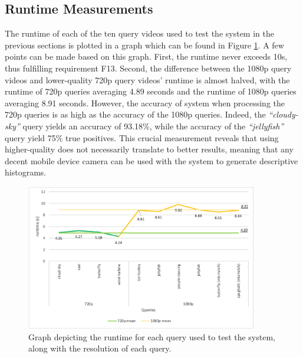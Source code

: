 \subsection{Runtime Measurements}

The runtime of each of the ten query videos used to test the system in the previous sections is plotted in a graph which can be found in Figure \ref{fig:evaluation-runtime_plot}. A few points can be made based on this graph. First, the runtime never exceeds 10s, thus fulfilling requirement F13. Second, the difference between the 1080p query videos and lower-quality 720p query videos' runtime is almost halved, with the runtime of 720p queries averaging 4.89 seconds and the runtime of 1080p queries averaging 8.91 seconds. However, the accuracy of system when processing the 720p queries is as high as the accuracy of the 1080p queries. Indeed, the \textit{``cloudy-sky''} query yields an accuracy of 93.18\%, while the accuracy of the \textit{``jellyfish''} query yield 75\% true positives. This crucial measurement reveals that using higher-quality does not necessarily translate to better results, meaning that any decent mobile device camera can be used with the system to generate descriptive histograms.

\begin{figure}[h] 
\centerline{\includegraphics[width=0.9\textwidth]{figures/evaluation/runtime_plot.png}}
\caption{\label{fig:evaluation-runtime_plot}Graph depicting the runtime for each query used to test the system, along with the resolution of each query.}
\end{figure}


